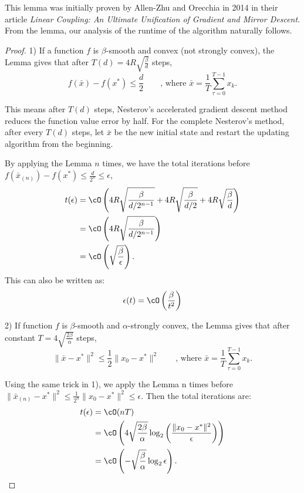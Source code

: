 This lemma was initially proven by Allen-Zhu and Orecchia in 2014 in their article \textit{Linear Coupling: An Ultimate Unification of Gradient and Mirror Descent}. From the lemma, our analysis of the runtime of the algorithm naturally follows.

\begin{proof}
1) If a function $f$ is $\beta$-smooth and convex (not strongly convex), the Lemma gives that after $T(d)=4R\sqrt{\frac{\beta}{d}}$ steps, 
\[f(\bar{x})- f(x^*)\leq \frac{d}{2}\qquad\text{, where } \bar{x} = \frac{1}{T}\sum_{\tau=0}^{T-1}x_k.\]

This means after $T(d)$ steps, Nesterov's accelerated gradient descent method reduces the function value error by half. For the complete Nesterov's method, after every $T(d)$ steps, let $\bar{x}$ be the new initial state and restart the updating algorithm from the beginning. %

\indent By applying the Lemma $n$ times, we have the total iterations before $f(\bar{x}_{(n)})-f(x^*)\leq\frac{d}{2^{n}}\leq\epsilon$,
\begin{align*}
t(\epsilon) &= \cO \left(4R\sqrt{\frac{\beta}{d/2^{n-1}}} + 4R\sqrt{\frac{\beta}{d/2}} + 4R\sqrt{\frac{\beta}{d}}\right)\\
  &= \cO \left(4R\sqrt{\frac{\beta}{d/2^{n-1}}}\right)\\
  &= \cO \left(\sqrt{\frac{\beta}{\epsilon}}\right).
\end{align*}
\indent This can also be written as: 
\[\epsilon(t) = \cO \left(\frac{\beta}{t^2} \right)\]

2) If function $f$ is $\beta$-smooth and $\alpha$-strongly convex, the Lemma gives that after constant $T=4\sqrt{\frac{2\beta}{\alpha}}$ steps,
\[\|\bar{x} - x^*\|^2 \leq \frac{1}{2}\|x_0 - x^*\|^2 \qquad\text{, where } \bar{x} = \frac{1}{T}\sum_{\tau=0}^{T-1}x_k.\]

\indent Using the same trick in 1), we apply the Lemma n times before $\|\bar{x}_{(n)} - x^*\|^2 \leq \frac{1}{2^n}\|x_0 - x^*\|^2 \leq \epsilon$. Then the total iterations are:
\begin{align*}
t(\epsilon) &= \cO(nT)\\
            &= \cO \left (4\sqrt{\frac{2\beta}{\alpha}}\log_2 \left (\frac{\|x_0 - x^*\|^2}{\epsilon} \right) \right)\\
            &= \cO \left(-\sqrt{\frac{\beta}{\alpha}}\log_2\epsilon \right).
\end{align*}


\end{proof}
